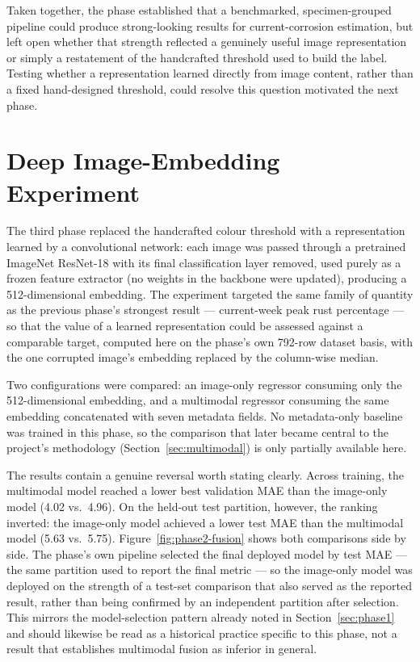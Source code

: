 Taken together, the phase established that a benchmarked, specimen-grouped
pipeline could produce strong-looking results for current-corrosion
estimation, but left open whether that strength reflected a genuinely useful
image representation or simply a restatement of the handcrafted threshold
used to build the label. Testing whether a representation learned directly
from image content, rather than a fixed hand-designed threshold, could
resolve this question motivated the next phase.

\section{Deep Image-Embedding Experiment}
\label{sec:phase2}

The third phase replaced the handcrafted colour threshold with a
representation learned by a convolutional network: each image was passed
through a pretrained ImageNet ResNet-18 with its final classification layer
removed, used purely as a frozen feature extractor (no weights in the
backbone were updated), producing a 512-dimensional embedding. The
experiment targeted the same family of quantity as the previous phase's
strongest result — current-week peak rust percentage — so that the value of
a learned representation could be assessed against a comparable target,
computed here on the phase's own 792-row dataset basis, with the one
corrupted image's embedding replaced by the column-wise median.

Two configurations were compared: an image-only regressor consuming only the
512-dimensional embedding, and a multimodal regressor consuming the same
embedding concatenated with seven metadata fields. No metadata-only baseline
was trained in this phase, so the comparison that later became central to
the project's methodology (Section~\ref{sec:multimodal}) is only partially
available here.

The results contain a genuine reversal worth stating clearly.
Across training, the multimodal model reached a lower best validation MAE
than the image-only model (4.02 vs.\ 4.96). On the held-out test partition,
however, the ranking inverted: the image-only model achieved a lower test
MAE than the multimodal model (5.63 vs.\ 5.75). Figure~\ref{fig:phase2-fusion}
shows both comparisons side by side. The phase's own pipeline selected the
final deployed model by test MAE — the same partition used to report the
final metric — so the image-only model was deployed on the strength of a
test-set comparison that also served as the reported result, rather than
being confirmed by an independent partition after selection. This mirrors
the model-selection pattern already noted in Section~\ref{sec:phase1} and
should likewise be read as a historical practice specific to this phase,
not a result that establishes multimodal fusion as inferior in general.

